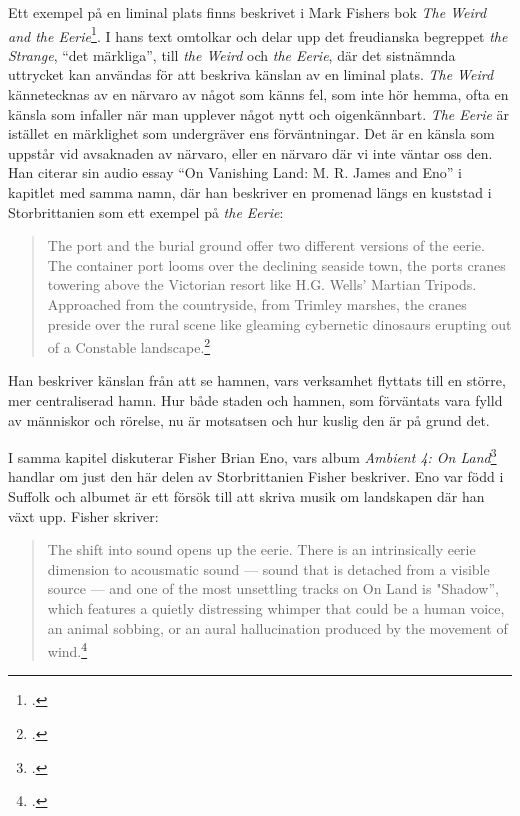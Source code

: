 \documentclass{article}
\begin{document}
Ett exempel på en liminal plats finns beskrivet i Mark Fishers bok \emph{The Weird and the
Eerie}\footcite{Fisher}. I hans text omtolkar och delar upp det freudianska begreppet \emph{the Strange},
``det märkliga'', till \emph{the Weird} och \emph{the Eerie}, där det sistnämnda uttrycket kan användas för
att beskriva känslan av en liminal plats. \emph{The Weird} kännetecknas av en närvaro av något som känns fel,
som inte hör hemma, ofta en känsla som infaller när man upplever något nytt och oigenkännbart. \emph{The
Eerie} är istället en märklighet som undergräver ens förväntningar. Det är en känsla som uppstår vid
avsaknaden av närvaro, eller en närvaro där vi inte väntar oss den. Han citerar sin audio essay ``On Vanishing
Land: M. R. James and Eno'' i kapitlet med samma namn, där han beskriver en promenad längs en kuststad i
Storbrittanien som ett exempel på \emph{the Eerie}:

\begin{quote}
The port and the burial ground offer two different versions of the eerie. The container port looms over the
declining seaside town, the ports cranes towering above the Victorian resort like H.G. Wells' Martian Tripods.
Approached from the countryside, from Trimley marshes, the cranes preside over the rural scene like gleaming
	cybernetic dinosaurs erupting out of a Constable landscape.\footcite[76]{Fisher}
\end{quote}

Han beskriver känslan från att se hamnen, vars verksamhet flyttats till en större, mer centraliserad hamn. 
Hur både staden och hamnen, som förväntats vara fylld av människor och rörelse, nu är motsatsen och hur kuslig
den är på grund det.

I samma kapitel diskuterar Fisher Brian Eno, vars album \emph{Ambient 4: On Land}\footcite{EnoLand} handlar om
just den här delen av Storbrittanien Fisher beskriver. Eno var född i Suffolk och albumet är ett försök till att skriva
musik om landskapen där han växt upp. Fisher skriver: 

\begin{quote}
The shift into sound opens up the eerie. There is an intrinsically eerie dimension to acousmatic sound — sound
that is detached from a visible source — and one of the most unsettling tracks on On Land is "Shadow”, which
features a quietly distressing whimper that could be a human voice, an animal sobbing, or an aural
	hallucination produced by the movement of wind.\footcite[81]{Fisher}
\end{quote}
\end{document}
